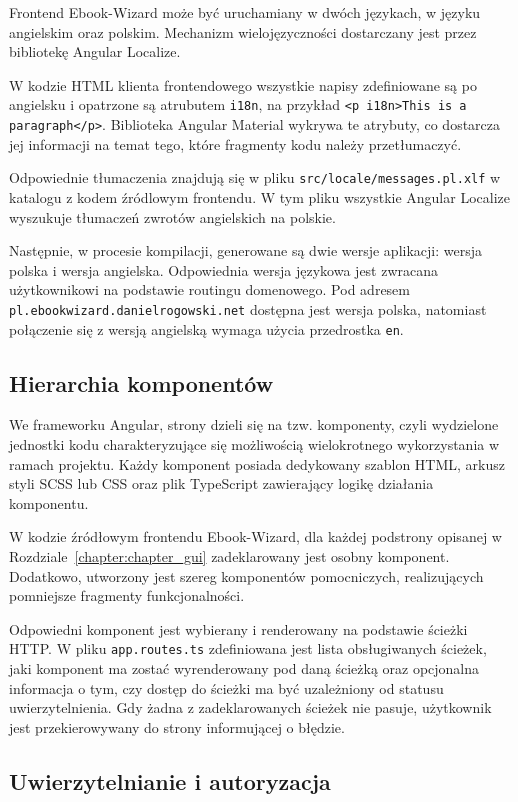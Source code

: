 Frontend Ebook-Wizard może być uruchamiany w dwóch językach, w języku angielskim oraz polskim. Mechanizm wielojęzyczności dostarczany jest przez bibliotekę Angular Localize. 

W kodzie HTML klienta frontendowego wszystkie napisy zdefiniowane są po angielsku i opatrzone są atrubutem \verb|i18n|, na przykład \verb|<p i18n>This is a paragraph</p>|. Biblioteka Angular Material wykrywa te atrybuty, co dostarcza jej informacji na temat tego, które fragmenty kodu należy przetłumaczyć.

Odpowiednie tłumaczenia znajdują się w pliku \verb|src/locale/messages.pl.xlf| w katalogu z kodem źródlowym frontendu. W tym pliku wszystkie Angular Localize wyszukuje tłumaczeń zwrotów angielskich na polskie.

Następnie, w procesie kompilacji, generowane są dwie wersje aplikacji: wersja polska i wersja angielska. Odpowiednia wersja językowa jest zwracana użytkownikowi na podstawie routingu domenowego. Pod adresem \texttt{pl.ebookwizard.danielrogowski.net} dostępna jest wersja polska, natomiast połączenie się z wersją angielską wymaga użycia przedrostka \texttt{en}.

\subsection{Hierarchia komponentów}

We frameworku Angular, strony dzieli się na tzw. komponenty, czyli wydzielone jednostki kodu charakteryzujące się możliwością wielokrotnego wykorzystania w ramach projektu. Każdy komponent posiada dedykowany szablon HTML, arkusz styli SCSS lub CSS oraz plik TypeScript zawierający logikę działania komponentu.

W kodzie źródłowym frontendu Ebook-Wizard, dla każdej podstrony opisanej w Rozdziale~\ref{chapter:chapter_gui} zadeklarowany jest osobny komponent. Dodatkowo, utworzony jest szereg komponentów pomocniczych, realizujących pomniejsze fragmenty funkcjonalności.

Odpowiedni komponent jest wybierany i renderowany na podstawie ścieżki HTTP. W pliku \verb|app.routes.ts| zdefiniowana jest lista obsługiwanych ścieżek, jaki komponent ma zostać wyrenderowany pod daną ścieżką oraz opcjonalna informacja o tym, czy dostęp do ścieżki ma być uzależniony od statusu uwierzytelnienia. Gdy żadna z zadeklarowanych ścieżek nie pasuje, użytkownik jest przekierowywany do strony informującej o błędzie.

\subsection{Uwierzytelnianie i autoryzacja}

